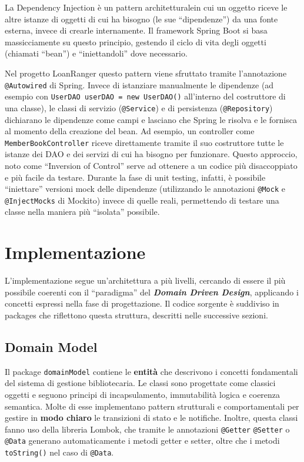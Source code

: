 \documentclass[
  italian,
  paper=a4,
  ,captions=tableheading
]{scrbook}
\newcommand{\passthrough}[1]{#1}
\begin{document}
La Dependency Injection è un pattern architetturale\footnotemark[2] in
cui un oggetto riceve le altre istanze di oggetti di cui ha bisogno (le
sue ``dipendenze'') da una fonte esterna, invece di crearle
internamente. Il framework Spring Boot si basa massicciamente su questo
principio, gestendo il ciclo di vita degli oggetti (chiamati ``bean'') e
``iniettandoli'' dove necessario.

Nel progetto LoanRanger questo pattern viene sfruttato tramite
l'annotazione \passthrough{\lstinline!@Autowired!} di Spring. Invece di
istanziare manualmente le dipendenze (ad esempio con
\passthrough{\lstinline!UserDAO userDAO = new UserDAO()!} all'interno
del costruttore di una classe), le classi di servizio
(\passthrough{\lstinline!@Service!}) e di persistenza
(\passthrough{\lstinline!@Repository!}) dichiarano le dipendenze come
campi e lasciano che Spring le risolva e le fornisca al momento della
creazione del bean. Ad esempio, un controller come
\passthrough{\lstinline!MemberBookController!} riceve direttamente
tramite il suo costruttore tutte le istanze dei DAO e dei servizi di cui
ha bisogno per funzionare. Questo approccio, noto come ``Inversion of
Control'' serve ad ottenere a un codice più disaccoppiato e più facile
da testare. Durante la fase di unit testing, infatti, è possibile
``iniettare'' versioni mock delle dipendenze (utilizzando le annotazioni
\passthrough{\lstinline!@Mock!} e \passthrough{\lstinline!@InjectMocks!}
di Mockito) invece di quelle reali, permettendo di testare una classe
nella maniera più ``isolata'' possibile.

\chapter{Implementazione}\label{implementazione}

L'implementazione segue un'architettura a più livelli, cercando di
essere il più possibile coerenti con il ``paradigma'' del
\textbf{\emph{Domain Driven Design}}, applicando i concetti espressi
nella fase di progettazione. Il codice sorgente è suddiviso in packages
che riflettono questa struttura, descritti nelle successive sezioni.

\section{Domain Model}\label{domain-model}

Il package \passthrough{\lstinline!domainModel!} contiene le
\textbf{entità} che descrivono i concetti fondamentali del sistema di
gestione bibliotecaria. Le classi sono progettate come classici oggetti
e seguono principi di incapsulamento, immutabilità logica e coerenza
semantica. Molte di esse implementano pattern strutturali e
comportamentali per gestire in \textbf{modo chiaro} le transizioni di
stato e le notifiche. Inoltre, questa classi fanno uso della libreria
Lombok, che tramite le annotazioni \passthrough{\lstinline!@Getter!}
\passthrough{\lstinline!@Setter!} o \passthrough{\lstinline!@Data!}
generano automaticamente i metodi getter e setter, oltre che i metodi
\passthrough{\lstinline!toString()!} nel caso di
\passthrough{\lstinline!@Data!}.
\end{document}
